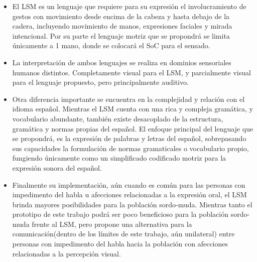 \begin{itemize}
	\item El LSM es un lenguaje que requiere para su expresión el involucramiento de gestos con movimiento desde encima de la cabeza y hasta debajo de la cadera, incluyendo movimiento de manos, expresiones faciales y mirada intencional. Por su parte el lenguaje motriz que se propondrá se limita únicamente a 1 mano, donde se colocará el SoC para el sensado.
	
	\item La interpretación de ambos lenguajes se realiza en dominios sensoriales humanos distintos. Completamente visual para el LSM, y parcialmente visual para el lenguaje propuesto, pero principalmente auditivo.
	
	\item Otra diferencia importante se encuentra en la complejidad y relación con el idioma español. Mientras el LSM cuenta con una rica y compleja gramática, y vocabulario abundante, también existe desacoplado de la estructura, gramática y normas propias del español. El enfoque principal del lenguaje que se propondrá, es la expresión de palabras y letras del español, sobrepasando sus capacidades la formulación de normas gramaticales o vocabulario propio, fungiendo únicamente como un simplificado codificado motriz para la expresión sonora del español.
	
	\item Finalmente su implementación, aún cuando es común para las personas con impedimento del habla u afecciones relacionadas a la expresión oral, el LSM brinda mayores posibilidades para la población sordo-muda. Mientras tanto el prototipo de este trabajo podrá ser poco beneficioso para la población sordo-muda frente al LSM, pero propone una alternativa para la comunicación(dentro de los límites de este trabajo, aún unilateral) entre personas con impedimento del habla hacia la población con afecciones relacionadas a la percepción visual.
\end{itemize}






